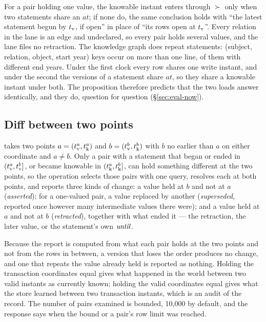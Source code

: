 For a pair holding one value, the knowable instant enters through $\succ$ only
when two statements share an $\mathit{at}$; if none do, the same conclusion
holds with ``the latest statement begun by $t_{\mathrm{v}}$, if open'' in place of ``its
rows open at $t_{\mathrm{v}}$''. Every relation in the lane is an edge and undeclared, so
every pair holds several values, and the lane files no retraction. The knowledge
graph does repeat statements:  (subject, relation, object,
start year) keys occur on more than one line,  of them with
different end years. Under the first clock every row shares one write instant,
and under the second the versions of a statement share $\mathit{at}$, so they
share a knowable instant under both. The proposition therefore predicts that
the two loads answer identically, and they do, question for question
(\S\ref{sec:eval-now}).

\subsection{Diff between two points}

\shipped{}  takes two points $a = (t_{\mathrm{v}}^a, t_{\mathrm{k}}^a)$ and
$b = (t_{\mathrm{v}}^b, t_{\mathrm{k}}^b)$ with $b$ no earlier than $a$ on either coordinate and
$a \ne b$. Only a pair with a statement that began or ended in
$(t_{\mathrm{v}}^a, t_{\mathrm{v}}^b]$, or became knowable in $(t_{\mathrm{k}}^a, t_{\mathrm{k}}^b]$, can hold something
different at the two points, so the operation selects those pairs with one
query, resolves each at both points, and reports three kinds of change:
a value held at $b$ and not at $a$ (\emph{asserted}); for a one-valued pair, a
value replaced by another (\emph{superseded}, reported once however many
intermediate values there were); and a value held at $a$ and not at $b$
(\emph{retracted}), together with what ended it --- the retraction, the later
value, or the statement's own $\mathit{until}$.

Because the report is computed from what each pair holds at the two points and
not from the rows in between, a version that loses the order produces no change,
and one that repeats the value already held is reported as nothing. Holding the
transaction coordinates equal gives what happened in the world between two
valid instants as currently known; holding the valid coordinates equal gives
what the store learned between two transaction instants, which is an audit of
the record. The number of pairs examined is bounded, 10{,}000 by default, and
the response says when the bound or a pair's row limit was reached.
